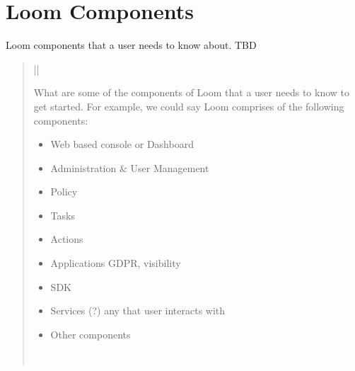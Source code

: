 \documentclass[letterpaper,10pt,english]{sphinxmanual}
\begin{document}
\section{Loom Components}
\label{\detokenize{loom_getting_started_guide:loom-components}}
Loom components that a user needs to know about. TBD
\begin{quote}


\begin{savenotes}\sphinxattablestart
\centering
\begin{tabular}[t]{|*{1}{|}}
\hline

 What are some of the components of Loom that a user needs to
know to get started. For example, we could say \textendash{} Loom comprises of the
following components:
\begin{itemize}
\item {} 
Web based console or Dashboard

\item {} 
Administration \& User Management

\item {} 
Policy

\item {} 
Tasks

\item {} 
Actions

\item {} 
Applications \textendash{} GDPR, visibility

\item {} 
SDK

\item {} 
Services (?) any that user interacts with

\item {} 
Other components

\end{itemize}
\\
\hline
\end{tabular}
\par
\sphinxattableend\end{savenotes}
\end{quote}
\end{document}
